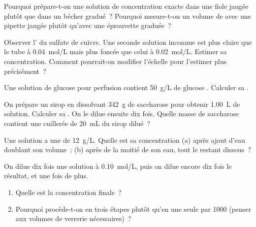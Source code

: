 \begin{exercise}[$\star\star$]\label{exo:g10:concentration-and-dilution:7}
Pourquoi prépare-t-on une solution de concentration exacte dans une
fiole jaugée plutôt que dans un bécher gradué~? Pourquoi mesure-t-on un
volume de  avec une pipette jaugée plutôt qu'avec une
éprouvette graduée~?
\end{exercise}

\begin{exercise}[$\star\star$]\label{exo:g10:concentration-and-dilution:8}
Observer l' du sulfate de cuivre. Une seconde solution
inconnue est plus claire que le tube à \qty{0.04}{mol/L} mais plus
foncée que celui à \qty{0.02}{mol/L}. Estimer sa concentration. Comment
pourrait-on modifier l'échelle pour l'estimer plus précisément~?
\end{exercise}

\begin{exercise}[$\star\star$]\label{exo:g10:concentration-and-dilution:9}
Une solution de glucose pour perfusion contient \qty{50}{g/L} de glucose
. Calculer sa .
\end{exercise}

\begin{exercise}[$\star\star$]\label{exo:g10:concentration-and-dilution:10}
On prépare un sirop en dissolvant \qty{342}{g} de saccharose
 pour obtenir \qty{1.00}{L} de solution. Calculer sa
. On le dilue ensuite dix fois. Quelle masse de
saccharose contient une cuillerée de \qty{20}{mL} du sirop dilué~?
\end{exercise}

\begin{exercise}[$\star\star$]\label{exo:g10:concentration-and-dilution:11}
Une solution a une  de \qty{12}{g/L}. Quelle est
sa concentration (a) après ajout d'eau doublant son volume~; (b) après
 de la moitié de son eau, tout le  restant dissous~?
\end{exercise}

\begin{exercise}[$\star\star\star$]\label{exo:g10:concentration-and-dilution:12}
On dilue dix fois une solution à \qty{0.10}{mol/L}, puis on dilue encore
dix fois le résultat, et une fois de plus.
\begin{enumerate}
  \item Quelle est la concentration finale~?
  \item Pourquoi procède-t-on en trois étapes plutôt qu'en une seule
         par 1000 (penser aux volumes de verrerie nécessaires)~?
\end{enumerate}
\end{exercise}

